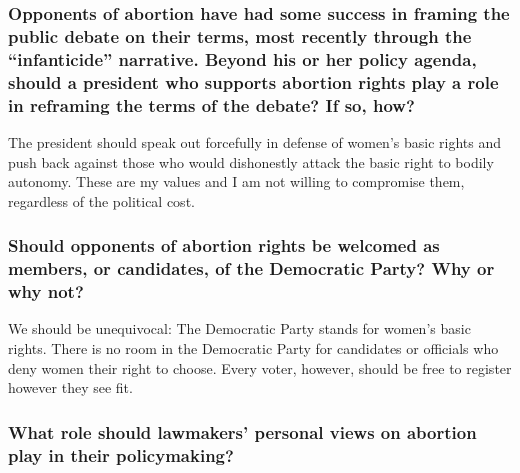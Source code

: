 \hypertarget{opponents-of-abortion-have-had-some-success-in-framing-the-public-debate-on-their-terms-most-recently-through-the-infanticide-narrative-beyond-his-or-her-policy-agenda-should-a-president-who-supports-abortion-rights-play-a-role-in-reframing-the-terms-of-the-debate-if-so-how-6}{%
\subsubsection{Opponents of abortion have had some success in framing
the public debate on their terms, most recently through the
``infanticide'' narrative. Beyond his or her policy agenda, should a
president who supports abortion rights play a role in reframing the
terms of the debate? If so,
how?}\label{opponents-of-abortion-have-had-some-success-in-framing-the-public-debate-on-their-terms-most-recently-through-the-infanticide-narrative-beyond-his-or-her-policy-agenda-should-a-president-who-supports-abortion-rights-play-a-role-in-reframing-the-terms-of-the-debate-if-so-how-6}}

The president should speak out forcefully in defense of women's basic
rights and push back against those who would dishonestly attack the
basic right to bodily autonomy. These are my values and I am not willing
to compromise them, regardless of the political cost.

\hypertarget{should-opponents-of-abortion-rights-be-welcomed-as-members-or-candidates-of-the-democratic-party-why-or-why-not-6}{%
\subsubsection{Should opponents of abortion rights be welcomed as
members, or candidates, of the Democratic Party? Why or why
not?}\label{should-opponents-of-abortion-rights-be-welcomed-as-members-or-candidates-of-the-democratic-party-why-or-why-not-6}}

We should be unequivocal: The Democratic Party stands for women's basic
rights. There is no room in the Democratic Party for candidates or
officials who deny women their right to choose. Every voter, however,
should be free to register however they see fit.

\hypertarget{what-role-should-lawmakers-personal-views-on-abortion-play-in-their-policymaking-6}{%
\subsubsection{What role should lawmakers' personal views on abortion
play in their
policymaking?}\label{what-role-should-lawmakers-personal-views-on-abortion-play-in-their-policymaking-6}}

